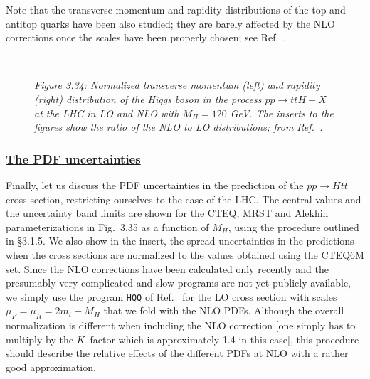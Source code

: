 Note that the transverse momentum and rapidity distributions of the
top and antitop quarks have been also studied; they are barely affected by the
NLO corrections once the scales have been properly chosen; see  
Ref.~\cite{Htt-NLO-DESY}. \s

\begin{figure}[!h] 
\begin{center}
\hspace*{-5mm}
\mbox{
\hspace*{-2mm}
 }
\end{center}
\vspace*{-.5cm}
{\it Figure 3.34: Normalized transverse momentum (left) and rapidity (right)
distribution of the Higgs boson in the process $p p\to t\bar{t}H + X$ at the 
LHC in LO and NLO with $M_H\! =\! 120$ GeV. The inserts to the figures show the
ratio of the NLO to LO distributions; from Ref.~\cite{Htt-NLO-DESY}.}
\label{fig:ptH-lhc}
\end{figure}


\subsubsection*{\underline{The PDF uncertainties}}

Finally, let us discuss the PDF uncertainties in the prediction of the $pp \to 
H t\bar t$ cross section, restricting ourselves to the case of the LHC.
The  central values and the uncertainty band limits are shown for the CTEQ, 
MRST and Alekhin parameterizations in Fig.~3.35 as a function of $M_H$, using 
the procedure outlined in \S3.1.5. We also show in the insert, the spread 
uncertainties in the predictions when the cross sections are normalized to the 
values obtained using the CTEQ6M set. Since the NLO corrections have been 
calculated only recently and the presumably very complicated and slow programs 
are not yet publicly available, we simply use the program {\tt HQQ} of
Ref.~\cite{Michael-Web} for the LO cross section with scales $\mu_F=\mu_R= 
2m_t+M_H$
that we fold with the NLO PDFs. Although the overall normalization is different 
when including the NLO correction [one simply has to multiply by the $K$--factor
which is approximately 1.4 in this case], this procedure should describe the 
relative effects of the different PDFs at NLO with a rather good approximation.  

